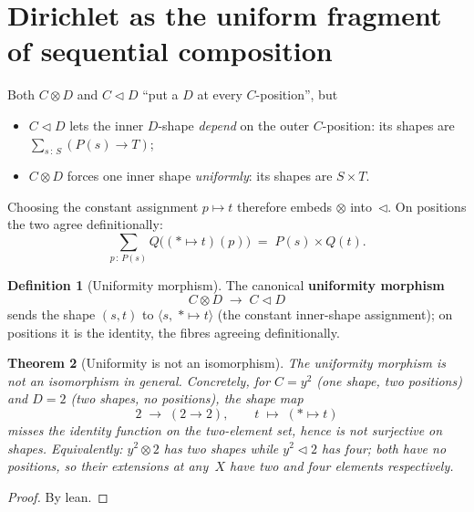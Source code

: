 \documentclass[11pt,a4paper]{article}
\theoremstyle{plain}
\newtheorem{theorem}{Theorem}[section]
\theoremstyle{definition}
\newtheorem{definition}[theorem]{Definition}
\newcommand{\seq}{\mathbin{\triangleleft}}
\newcommand{\Dir}{\mathbin{\otimes}}
\begin{document}
\section{Dirichlet as the uniform fragment of sequential composition}

Both $C \Dir D$ and $C \seq D$ ``put a $D$ at every $C$-position'', but
\begin{itemize}
  \item $C \seq D$ lets the inner $D$-shape \emph{depend} on the outer
        $C$-position: its shapes are $\sum_{s \,:\, S} (P(s) \to T)$;
  \item $C \Dir D$ forces one inner shape \emph{uniformly}: its shapes
        are $S \times T$.
\end{itemize}
Choosing the constant assignment $p \mapsto t$ therefore embeds $\Dir$
into~$\seq$. On positions the two agree definitionally:
\begin{equation}
  \sum_{p \,:\, P(s)} Q\bigl(({\ast} \mapsto t)(p)\bigr)
  \;=\;
  P(s) \times Q(t).
\end{equation}

\begin{definition}[Uniformity morphism]\label{def:dir-to-seq}
The canonical \textbf{uniformity morphism}
\[
  C \Dir D \;\longrightarrow\; C \seq D
\]
sends the shape $(s,t)$ to $\bigl\langle s,\; {\ast} \mapsto t \bigr\rangle$
(the constant inner-shape assignment); on positions it is the identity,
the fibres agreeing definitionally.
\end{definition}

\begin{theorem}[Uniformity is not an isomorphism]\label{thm:not-iso}
The uniformity morphism is not an isomorphism in general. Concretely,
for $C = y^2$ (one shape, two positions) and $D = 2$ (two shapes, no
positions), the shape map
\[
  2 \;\longrightarrow\; (2 \to 2),
  \qquad
  t \;\longmapsto\; ({\ast} \mapsto t)
\]
misses the identity function on the two-element set, hence is not
surjective on shapes. Equivalently: $y^2 \Dir 2$ has two shapes while
$y^2 \seq 2$ has four; both have no positions, so their extensions at
any~$X$ have two and four elements respectively.
\end{theorem}

\begin{proof}
By lean.
\end{proof}
\end{document}
